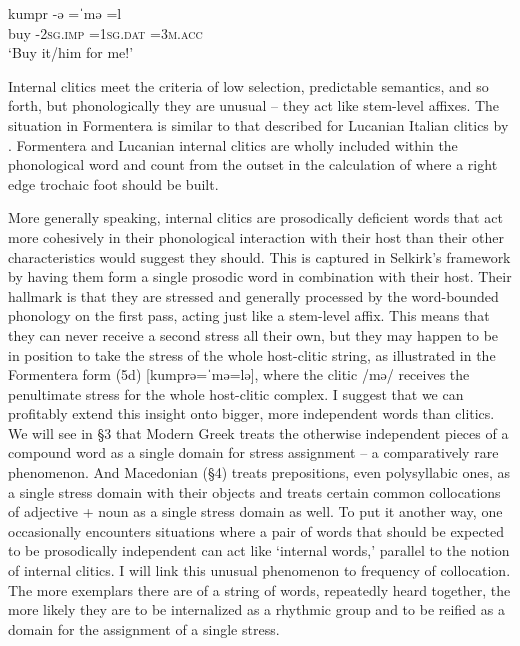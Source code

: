 \documentclass[output=paper,
modfonts
]{LSP/langsci}
\begin{document}
	\ex	\gll kumpr \squish-ə  \squish=ˈmə  \squish=l\\ 
		buy \squish-\textsc{2sg.imp} \squish\textsc{=1sg.dat} \squish\textsc{=3m.acc}\\
		\glt `Buy it/him for me!'
	\z
\z

\noindent Internal clitics meet the criteria of low selection, predictable semantics, and so forth, but phonologically they are unusual -- they act like stem-level affixes. The situation in Formentera is similar to that described for Lucanian Italian clitics by \citet{peperkamp1997}. Formentera and Lucanian internal clitics are wholly included within the phonological word and count from the outset in the calculation of where a right edge trochaic foot should be built.

More generally speaking, internal clitics are prosodically deficient words that act more cohesively in their phonological interaction with their host than their other characteristics would suggest they should. This is captured in Selkirk’s framework by having them form a single prosodic word in combination with their host. Their hallmark is that they are stressed and generally processed by the word-bounded phonology on the first pass, acting just like a stem-level affix. This means that they can never receive a second stress all their own, but they may happen to be in position to take the stress of the whole host-clitic string, as illustrated in the Formentera form (5d) [kumprə=ˈmə=lə], where the clitic /mə/ receives the penultimate stress for the whole host-clitic complex. I suggest that we can profitably extend this insight onto bigger, more independent words than clitics. We will see in §3 that Modern Greek treats the otherwise independent pieces of a compound word as a single domain for stress assignment -- a comparatively rare phenomenon. And Macedonian (§4) treats prepositions, even polysyllabic ones, as a single stress domain with their objects and treats certain common collocations of adjective + noun as a single stress domain as well. To put it another way, one occasionally encounters situations where a pair of words that should be expected to be prosodically independent can act like ‘internal words,’ parallel to the notion of internal clitics. I will link this unusual phenomenon to frequency of collocation. The more exemplars there are of a string of words, repeatedly heard together, the more likely they are to be internalized as a rhythmic group and to be reified as a domain for the assignment of a single stress.
\end{document}
